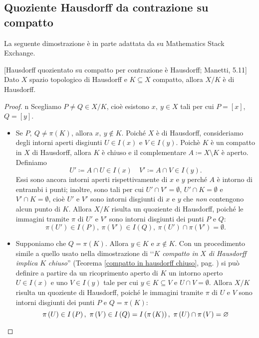 \subsection{Quoziente Hausdorff da contrazione su compatto}
La seguente dimostrazione è in parte adattata da \cite{user:hausdorff} su Mathematics Stack Exchange.
\begin{lemma}{}[Hausdorff quozientato su compatto per contrazione è Hausdorff; Manetti, 5.11]
	Dato $X$ spazio topologico di Hausdorff e $K\subseteq X$ compatto, allora $X/K$ è di Hausdorff.
\end{lemma}
\begin{proof}{n}
	Scegliamo $P\neq Q\in X/K$, cioè esistono $x,\ y\in X$ tali per cui $P=[x]$, $Q=[y]$.
	\begin{itemize}
		\item Se $P,\ Q\neq \pi\left(K\right)$, allora $x,\ y\notin K$. Poiché $X$ è di Hausdorff, consideriamo degli intorni aperti disgiunti $U\in I(x)$ e $V\in I(y)$. Poichè $K$ è un compatto in $X$ di Hausdorff, allora $K$ è chiuso e il complementare $A\coloneqq X\setminus K$ è aperto. Definiamo
		\begin{equation*}
			U'\coloneqq A\cap U\in I(x)\quad V'\coloneqq A\cap V\in I(y).
		\end{equation*}
		Essi sono ancora intorni aperti rispettivamente di $x$ e $y$ perché $A$ è intorno di entrambi i punti; inoltre, sono tali per cui $U'\cap V'=\emptyset$, $U'\cap K=\emptyset$ e $V'\cap K=\emptyset$, cioè $U'$ e $V'$ sono intorni disgiunti di $x$ e $y$ che \textit{non} contengono alcun punto di $K$. Allora $X/K$ risulta un quoziente di Hausdorff, poiché le immagini tramite $\pi$ di $U'$ e $V'$ sono intorni disgiunti dei punti $P$ e $Q$:
		\begin{equation*}
			\pi\left(U'\right)\in I\left(P\right),\ \pi\left(V'\right)\in I\left(Q\right),\ \pi\left(U'\right)\cap \pi\left(V'\right)=\emptyset.
		\end{equation*}
		\item Supponiamo che $Q=\pi\left(K\right)$. Allora $y\in K$ e $x\notin K$. Con un procedimento simile a quello usato nella dimostrazione di ‘‘$K$ \textit{compatto in} $X$ \textit{di Hausdorff implica} $K$ \textit{chiuso}'' (Teorema \ref{compatto in hausdorff chiuso}, pag. \pageref{compatto in hausdorff chiuso}) si può definire a partire da un ricoprimento aperto di $K$ un intorno aperto $U\in I(x)$ e uno $V\in I(y)$ tale per cui $y\in K\subseteq V$ e $U\cap V=\emptyset$. Allora $X/K$ risulta un quoziente di Hausdorff, poiché le immagini tramite $\pi$ di $U$ e $V$ sono intorni disgiunti dei punti $P$ e $Q=\pi\left(K\right)$:
		\begin{equation*}
			\pi\left(U\right)\in I\left(P\right),\ \pi\left(V\right)\in I\left(Q\right)=I\left(\pi\left(K\right)\right),\ \pi\left(U\right)\cap \pi\left(V\right)=\emptyset\qedhere
		\end{equation*}
	\end{itemize}
\end{proof}
\label{quozientehausdorffsuspaziocompatto}
